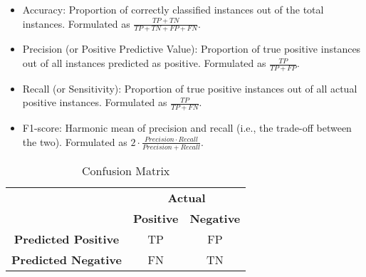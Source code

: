 \begin{itemize}
    \item Accuracy: Proportion of correctly classified instances out of the total instances.
    Formulated as $\frac{TP + TN}{TP + TN + FP + FN}$.
    \item Precision (or Positive Predictive Value): Proportion of true positive instances out of all instances predicted as positive.
    Formulated as $\frac{TP}{TP + FP}$.
    \item Recall (or Sensitivity): Proportion of true positive instances out of all actual positive instances.
    Formulated as $\frac{TP}{TP + FN}$.
    \item F1-score: Harmonic mean of precision and recall (i.e., the trade-off between the two).
    Formulated as $2 \cdot \frac{Precision \cdot Recall}{Precision + Recall}$.
\end{itemize}



\begin{table}[ht]
    \centering
    \begin{tabular}{c c c}
        \toprule
        \multirow{2}{*}{} & \multicolumn{2}{c}{\textbf{Actual}} \\
        \cmidrule(lr){2-3}
        & \textbf{Positive} & \textbf{Negative} \\
        \midrule
        \textbf{Predicted Positive} & TP & FP \\
        \textbf{Predicted Negative} & FN & TN \\
        \bottomrule
    \end{tabular}
    \caption{Confusion Matrix}
    \label{tab:confusion_matrix}
\end{table}

